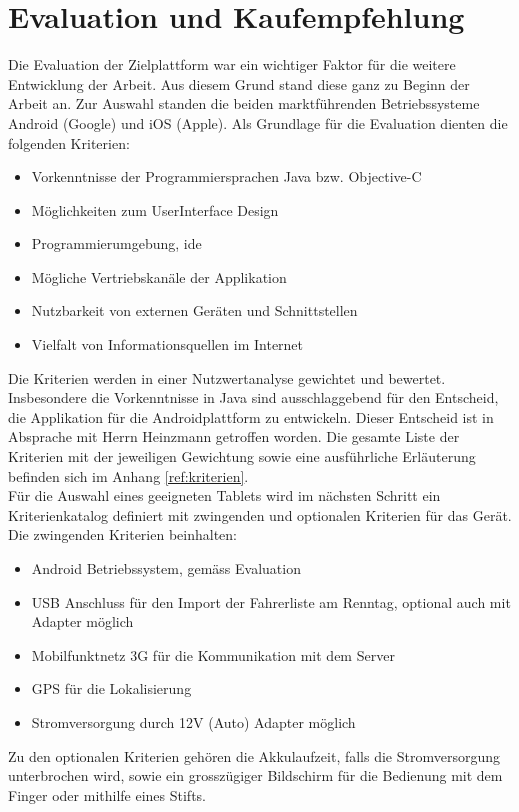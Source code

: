 \section{Evaluation und Kaufempfehlung}
\label{kap:kaufempfehlung}
Die Evaluation der Zielplattform war ein wichtiger Faktor für die weitere Entwicklung der Arbeit. Aus diesem Grund stand diese ganz zu Beginn der Arbeit an. Zur Auswahl standen die beiden marktführenden Betriebssysteme Android (Google) und iOS (Apple). Als Grundlage für die Evaluation dienten die folgenden Kriterien:
\begin{itemize}
\item Vorkenntnisse der Programmiersprachen Java bzw. Objective-C
\item Möglichkeiten zum UserInterface Design
\item Programmierumgebung, \gls{ide}
\item Mögliche Vertriebskanäle der Applikation
\item Nutzbarkeit von externen Geräten und Schnittstellen
\item Vielfalt von Informationsquellen im Internet
\end{itemize}
Die Kriterien werden in einer Nutzwertanalyse gewichtet und bewertet. Insbesondere die Vorkenntnisse in Java sind  ausschlaggebend für den Entscheid, die Applikation für die Androidplattform zu entwickeln. Dieser Entscheid ist in Absprache mit Herrn Heinzmann getroffen worden. Die gesamte Liste der Kriterien mit der jeweiligen Gewichtung sowie eine ausführliche Erläuterung befinden sich im Anhang \ref{ref:kriterien}.
\\
Für die Auswahl eines geeigneten Tablets wird im nächsten Schritt ein Kriterienkatalog definiert mit zwingenden und optionalen Kriterien für das Gerät. Die zwingenden Kriterien beinhalten:
\begin{itemize}
\item Android Betriebssystem, gemäss Evaluation
\item USB Anschluss für den Import der Fahrerliste am Renntag, optional auch mit Adapter möglich
\item Mobilfunktnetz 3G für die Kommunikation mit dem Server
\item GPS für die Lokalisierung
\item Stromversorgung durch 12V (Auto) Adapter möglich
\end{itemize}
Zu den optionalen Kriterien gehören die Akkulaufzeit, falls die Stromversorgung unterbrochen wird, sowie ein grosszügiger Bildschirm für die Bedienung mit dem Finger oder mithilfe eines Stifts.
